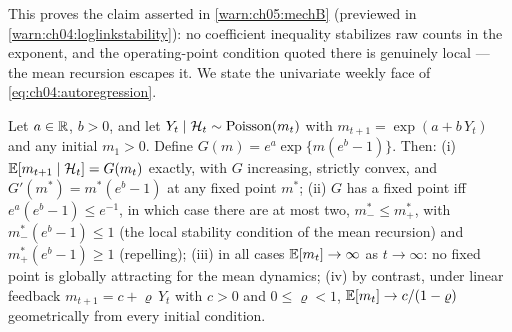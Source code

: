 This proves the claim asserted in \cref{warn:ch05:mechB} (previewed in
\cref{warn:ch04:loglinkstability}): no coefficient inequality stabilizes raw counts in the exponent,
and the operating-point condition quoted there is genuinely local --- the mean recursion escapes it.
We state the univariate weekly face of \cref{eq:ch04:autoregression}.
\begin{proposition}
\label{app:pf:loglink}
Let $a \in \mathbb{R}$, $b > 0$, and let $Y_t \mid \mathcal{H}_t \sim \mathrm{Poisson}(m_t)$ with $m_{t+1} = \exp(a +
b\, Y_t)$ and any initial $m_1 > 0$. Define $G(m) = e^{a} \exp\{m (e^{b} - 1)\}$. Then: (i)
$\mathbb{E}[m_{t+1} \mid \mathcal{H}_t] = G(m_t)$ exactly, with $G$ increasing, strictly convex, and $G'(m^*) = m^*
(e^b - 1)$ at any fixed point $m^*$; (ii) $G$ has a fixed point iff $e^{a}(e^{b}-1) \le e^{-1}$, in
which case there are at most two, $m^*_- \le m^*_+$, with $m^*_-(e^b - 1) \le 1$ (the local stability
condition of the mean recursion) and $m^*_+(e^b - 1) \ge 1$ (repelling); (iii) in all cases $\mathbb{E}[m_t]
\to \infty$ as $t \to \infty$: no fixed point is globally attracting for the mean dynamics; (iv) by
contrast, under linear feedback $m_{t+1} = c + \varrho\, Y_t$ with $c > 0$ and $0 \le \varrho < 1$,
$\mathbb{E}[m_t] \to c/(1-\varrho)$ geometrically from every initial condition.
\end{proposition}
